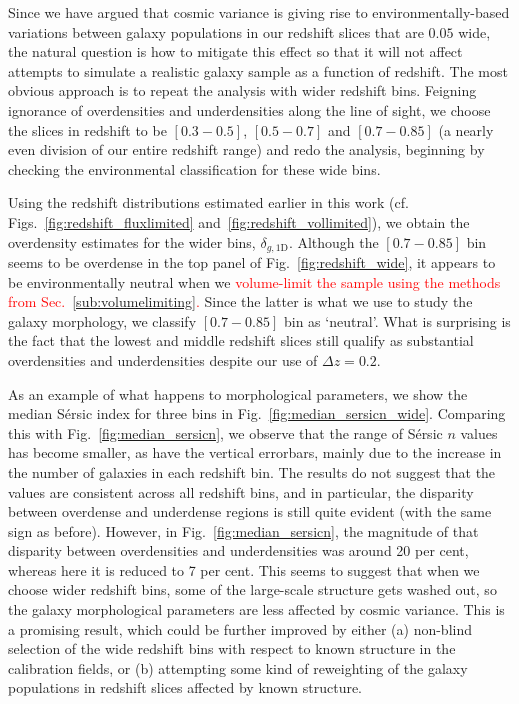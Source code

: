 \documentclass[twocolumn,useAMS,usenatbib]{mn2e}
\newcommand{\rachel}[1]{{\textcolor{red}{#1}}}
\newcommand{\sersic}{S\'{e}rsic }
\newcommand{\s}{\ensuremath{\mathcal{S}}}
\begin{document}
Since we have argued that cosmic variance is giving rise to
environmentally-based variations between galaxy populations in our
redshift slices that are $0.05$ wide, the natural question is how to
mitigate this effect so that it will not affect attempts to simulate a
realistic galaxy sample as a function of redshift.  The most obvious
approach is to repeat the analysis with wider redshift bins. Feigning ignorance of overdensities and underdensities along the line of sight, we choose the slices in redshift to be $\left[ 0.3 - 0.5 \right]$,
$\left[ 0.5 - 0.7\right]$ and $\left[ 0.7 - 0.85\right]$ (a nearly
even division of our entire redshift range) and redo the analysis,
beginning by checking the environmental classification for these wide bins.

Using the redshift distributions estimated earlier in this work (cf. Figs.~\ref{fig:redshift_fluxlimited}
and~\ref{fig:redshift_vollimited}), we obtain the overdensity estimates for
the wider bins, $\delta_{g,\text{1D}}$.
Although the $\left[ 0.7 - 0.85\right]$ bin seems to be overdense in
the top panel of Fig.~\ref{fig:redshift_wide}, it appears to be
environmentally neutral when we \rachel{volume-limit the sample 
using the methods from Sec.~\ref{sub:volumelimiting}.}  
Since the latter is what we use to study the galaxy morphology, we
classify $\left[ 0.7 - 0.85\right]$ bin as `neutral'.
What is surprising is the fact that the lowest and middle redshift
slices still qualify as substantial overdensities and underdensities
despite our use of $\Delta z=0.2$.

As an example of what happens to morphological parameters, we show the
median \sersic index for three bins in
Fig.~\ref{fig:median_sersicn_wide}.  Comparing this with
Fig.~\ref{fig:median_sersicn}, we observe that the 
range of \sersic $n$ values has become smaller, as have the vertical errorbars, mainly due to the increase in the number of galaxies in each redshift bin. The results do not suggest that the values
are consistent across all redshift bins, and in particular, the
disparity between overdense and underdense regions is still quite
evident (with the same sign as before). However, in
Fig.~\ref{fig:median_sersicn}, the magnitude of that disparity between
overdensities and underdensities was around 20 per cent, whereas here
it is reduced to 7 per cent.  This seems to suggest that when we
choose wider redshift bins, some of the large-scale structure gets washed out, 
so the galaxy morphological parameters are less affected by cosmic
variance.  This is a promising result, which could be further improved
by either (a) non-blind selection of the wide redshift bins with respect to
known structure in the calibration fields, or (b) attempting some kind of
reweighting of the galaxy populations in redshift slices affected by
known structure.
\end{document}
